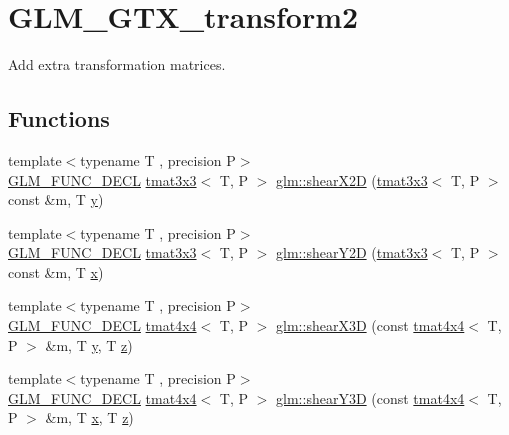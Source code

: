 \hypertarget{group__gtx__transform2}{}\section{G\+L\+M\+\_\+\+G\+T\+X\+\_\+transform2}
\label{group__gtx__transform2}


Add extra transformation matrices.  


\subsection*{Functions}
\begin{DoxyCompactItemize}
\item 
{\footnotesize template$<$typename T , precision P$>$ }\\\mbox{\hyperlink{setup_8hpp_ab2d052de21a70539923e9bcbf6e83a51}{G\+L\+M\+\_\+\+F\+U\+N\+C\+\_\+\+D\+E\+CL}} \mbox{\hyperlink{structglm_1_1tmat3x3}{tmat3x3}}$<$ T, P $>$ \mbox{\hyperlink{group__gtx__transform2_ga10f6c62d8f827c4cacedb71fd05e4ba2}{glm\+::shear\+X2D}} (\mbox{\hyperlink{structglm_1_1tmat3x3}{tmat3x3}}$<$ T, P $>$ const \&m, T \mbox{\hyperlink{glad_8h_a66ddd433d2cacfe27f5906b7e86faeed}{y}})
\item 
{\footnotesize template$<$typename T , precision P$>$ }\\\mbox{\hyperlink{setup_8hpp_ab2d052de21a70539923e9bcbf6e83a51}{G\+L\+M\+\_\+\+F\+U\+N\+C\+\_\+\+D\+E\+CL}} \mbox{\hyperlink{structglm_1_1tmat3x3}{tmat3x3}}$<$ T, P $>$ \mbox{\hyperlink{group__gtx__transform2_ga21ade82859e09a5cdaf4a01fbf8dc61b}{glm\+::shear\+Y2D}} (\mbox{\hyperlink{structglm_1_1tmat3x3}{tmat3x3}}$<$ T, P $>$ const \&m, T \mbox{\hyperlink{glad_8h_a92d0386e5c19fb81ea88c9f99644ab1d}{x}})
\item 
{\footnotesize template$<$typename T , precision P$>$ }\\\mbox{\hyperlink{setup_8hpp_ab2d052de21a70539923e9bcbf6e83a51}{G\+L\+M\+\_\+\+F\+U\+N\+C\+\_\+\+D\+E\+CL}} \mbox{\hyperlink{structglm_1_1tmat4x4}{tmat4x4}}$<$ T, P $>$ \mbox{\hyperlink{group__gtx__transform2_gae06ce274e4754f925d5d68440e89452e}{glm\+::shear\+X3D}} (const \mbox{\hyperlink{structglm_1_1tmat4x4}{tmat4x4}}$<$ T, P $>$ \&m, T \mbox{\hyperlink{glad_8h_a66ddd433d2cacfe27f5906b7e86faeed}{y}}, T \mbox{\hyperlink{glad_8h_acb78bf1972d3eaf07da34ff2e0a2f133}{z}})
\item 
{\footnotesize template$<$typename T , precision P$>$ }\\\mbox{\hyperlink{setup_8hpp_ab2d052de21a70539923e9bcbf6e83a51}{G\+L\+M\+\_\+\+F\+U\+N\+C\+\_\+\+D\+E\+CL}} \mbox{\hyperlink{structglm_1_1tmat4x4}{tmat4x4}}$<$ T, P $>$ \mbox{\hyperlink{group__gtx__transform2_ga31253ea18fdcdfde08c134c8b67688f7}{glm\+::shear\+Y3D}} (const \mbox{\hyperlink{structglm_1_1tmat4x4}{tmat4x4}}$<$ T, P $>$ \&m, T \mbox{\hyperlink{glad_8h_a92d0386e5c19fb81ea88c9f99644ab1d}{x}}, T \mbox{\hyperlink{glad_8h_acb78bf1972d3eaf07da34ff2e0a2f133}{z}})

\end{DoxyCompactItemize}
